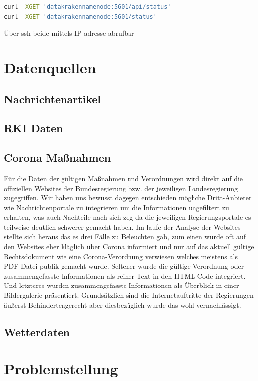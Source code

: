 \documentclass[12pt,oneside,a4paper,parskip]{scrbook}
\begin{document}
\begin{lstlisting}[caption=Statusabfrage Kibana,label=statuskibana,language=bash]
curl -XGET 'datakrakennamenode:5601/api/status'
curl -XGET 'datakrakennamenode:5601/status'
\end{lstlisting}

Über ssh beide mittels IP adresse abrufbar

\chapter{Datenquellen}
\section{Nachrichtenartikel}
\section{RKI Daten}
\section{Corona Maßnahmen}
Für die Daten der gültigen Maßnahmen und Verordnungen wird direkt auf die offiziellen Websites der Bundesregierung bzw. der jeweiligen Landesregierung zugegriffen. Wir haben uns bewusst dagegen entschieden mögliche Dritt-Anbieter wie Nachrichtenportale zu integrieren um die Informationen ungefiltert zu erhalten, was auch Nachteile nach sich zog da die jeweiligen Regierungsportale es teilweise deutlich schwerer gemacht haben. Im laufe der Analyse der Websites stellte sich heraus das es drei Fälle zu Beleuchten gab, zum einen wurde oft auf den Websites eher kläglich über Corona informiert und nur auf das aktuell gültige Rechtsdokument wie eine Corona-Verordnung verwiesen welches meistens als PDF-Datei publik gemacht wurde. Seltener wurde die gültige Verordnung oder zusammengefasste Informationen als reiner Text in den HTML-Code integriert. Und letzteres wurden zusammengefasste Informationen als Überblick in einer Bildergalerie präsentiert. Grundsätzlich sind die Internetauftritte der Regierungen äußerst Behindertengerecht aber diesbezüglich wurde das wohl vernachlässigt.

\section{Wetterdaten}

\chapter{Problemstellung}
\end{document}
